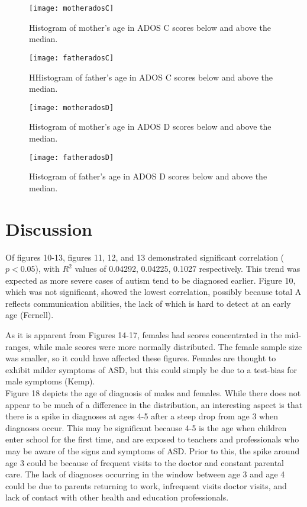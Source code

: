\documentclass{article}
\begin{document}
\begin{figure}[!htb]
  \centering
  \begin{minipage}[h!]{0.49\linewidth}
    \texttt{[image: motheradosC]}
    \caption{Histogram of mother's age in ADOS C scores below and above the median.}
  \end{minipage}
  \hfill
  \begin{minipage}[h!]{0.49\linewidth}
    \texttt{[image: fatheradosC]}
    \caption{HHistogram of father's age in ADOS C scores below and above the median.}
  \end{minipage}
\end{figure}

\begin{figure}[!htb]
  \centering
  \begin{minipage}[h!]{0.49\linewidth}
    \texttt{[image: motheradosD]}
    \caption{Histogram of mother's age in ADOS D scores below and above the median.}
  \end{minipage}
  \hfill
  \begin{minipage}[h!]{0.49\linewidth}
    \texttt{[image: fatheradosD]}
    \caption{Histogram of father's age in ADOS D scores below and above the median.}
  \end{minipage}
\end{figure}
\section{Discussion}

Of figures 10-13, figures 11, 12, and 13 demonstrated significant correlation ($p<0.05$), with $R^2$ values of 0.04292, 0.04225, 0.1027 respectively. This trend was expected as more severe cases of autism tend to be diagnosed earlier. Figure 10, which was not significant, showed the lowest correlation, possibly because total A reflects communication abilities, the lack of which is hard to detect at an early age (Fernell). 

As it is apparent from Figures 14-17, females had scores concentrated in the mid-ranges, while male scores were more normally distributed. The female sample size was smaller, so it could have affected these figures. Females are thought to exhibit milder symptoms of ASD, but this could simply be due to a test-bias for male symptoms (Kemp).\\

Figure 18 depicts the age of diagnosis of males and females. While there does not appear to be much of a difference in the distribution, an interesting aspect is that there is a spike in diagnoses at ages 4-5 after a steep drop from age 3 when diagnoses occur. This may be significant because 4-5 is the age when children enter school for the first time, and are exposed to teachers and professionals who may be aware of the signs and symptoms of ASD. Prior to this, the spike around age 3 could be because of frequent visits to the doctor and constant parental care. The lack of diagnoses occurring in the window between age 3 and age 4 could be due to parents returning to work, infrequent visits doctor visits, and lack of contact with other health and education professionals.\\
\end{document}
